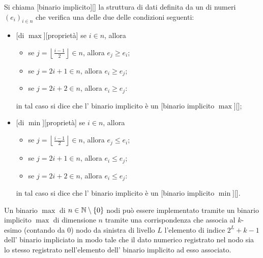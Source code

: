 \begin{Definition}
  Si chiama
  [binario implicito][]
  la struttura di dati definita da un  di numeri
  $(e_i)_{i \in n}$ che verifica una delle due delle condizioni seguenti:
  \begin{itemize}
    \item {}[di  $\max$][propriet\`a]
      se $i \in n$, allora
      \begin{itemize}
        \item se $j = \left \lfloor \frac{i - 1}{2} \right \rfloor \in n$,
          allora $e_j \geq e_i$;
        \item se $j = 2i + 1 \in n$,
          allora $e_i \geq e_j$;
        \item se $j = 2i + 2 \in n$,
          allora $e_i \geq e_j$:
      \end{itemize}
      in tal caso si dice che l' binario implicito \`e un
      [binario implicito $\max$][];
    \item {}[di  $\min$][propriet\`a]
      se $i \in n$, allora
      \begin{itemize}
        \item se $j = \left \lfloor \frac{i - 1}{2} \right \rfloor \in n$,
          allora $e_j \leq e_i$;
        \item se $j = 2i + 1 \in n$,
          allora $e_i \leq e_j$;
        \item se $j = 2i + 2 \in n$,
          allora $e_i \leq e_j$:
      \end{itemize}
      in tal caso si dice che l' binario implicito \`e un
      [binario implicito $\min$][].
  \end{itemize}
\end{Definition}
\begin{Theorem}
  Un  binario $\max$ di $n \in \mathbb{N} \setminus \lbrace 0 \rbrace$ nodi pu\`o
  essere implementato tramite un  binario implicito $\max$ di
  dimensione $n$ tramite una corrispondenza che associa al $k$-esimo (contando
  da $0$) nodo da sinistra di livello $L$ l'elemento di indice $2^L + k - 1$
  dell' binario impliciato in modo tale che il dato numerico
  registrato nel nodo sia lo stesso registrato nell'elemento dell'
  binario implicito ad esso associato.
\end{Theorem}
